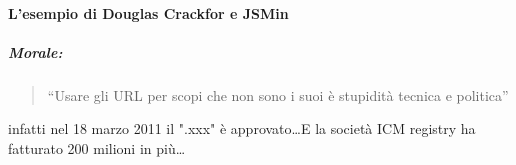 			\paragraph{L'esempio di Douglas Crackfor e JSMin}
			
			\subparagraph*{Morale:}
			\begin{quote}
				``Usare gli URL per scopi che non sono i suoi è stupidità tecnica e politica''
			\end{quote}
			infatti nel 18 marzo 2011 il ".xxx" è approvato\dots E la società ICM registry ha fatturato 200 milioni in più\dots